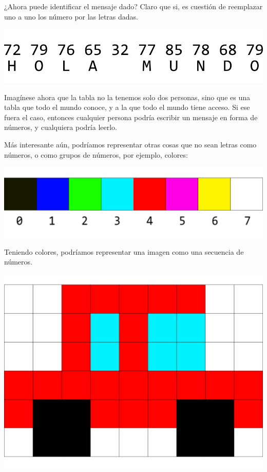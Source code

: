¿Ahora puede identificar el mensaje dado? Claro que si, es cuestión de
reemplazar uno a uno los número por las letras dadas.

\centerline{\includegraphics[]{unidades/2_informacion/1_bajo_nivel/imagenes/ascii_message_B.png}}

Imagínese ahora que la tabla no la tenemos solo dos personas, sino que es una
tabla que todo el mundo conoce, y a la que todo el mundo tiene acceso. Si ese
fuera el caso, entonces cualquier persona podría escribir un mensaje en forma de
números, y cualquiera podría leerlo.

Más interesante aún, podríamos representar otras cosas que no sean letras como
números, o como grupos de números, por ejemplo, colores:\autocite{msx_1985}

\centerline{\includegraphics[scale=0.8]{unidades/2_informacion/1_bajo_nivel/imagenes/palette_3bits.png}}

Teniendo colores, podríamos representar una imagen como una secuencia de
números.

\centerline{\includegraphics[scale=0.75]{unidades/2_informacion/1_bajo_nivel/imagenes/pixels_car.png}}

